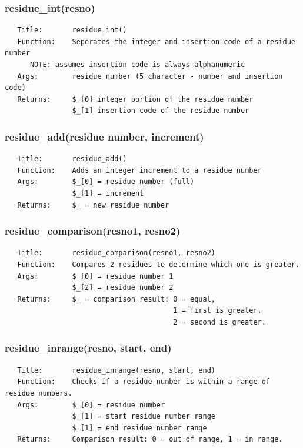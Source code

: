 \documentclass{article}
\begin{document}
\subsubsection*{residue\_int(resno)\label{pibase::residue_math_residue_int_resno_}}
\begin{verbatim}
   Title:       residue_int()
   Function:    Seperates the integer and insertion code of a residue number
      NOTE: assumes insertion code is always alphanumeric
   Args:        residue number (5 character - number and insertion code)
   Returns:     $_[0] integer portion of the residue number
                $_[1] insertion code of the residue number
\end{verbatim}
\subsubsection*{residue\_add(residue number, increment)\label{pibase::residue_math_residue_add_residue_number_increment_}}
\begin{verbatim}
   Title:       residue_add()
   Function:    Adds an integer increment to a residue number
   Args:        $_[0] = residue number (full)
                $_[1] = increment
   Returns:     $_ = new residue number
\end{verbatim}
\subsubsection*{residue\_comparison(resno1, resno2)\label{pibase::residue_math_residue_comparison_resno1_resno2_}}
\begin{verbatim}
   Title:       residue_comparison(resno1, resno2)
   Function:    Compares 2 residues to determine which one is greater.
   Args:        $_[0] = residue number 1
                $_[2] = residue number 2
   Returns:     $_ = comparison result: 0 = equal,
                                        1 = first is greater,
                                        2 = second is greater.
\end{verbatim}
\subsubsection*{residue\_inrange(resno, start, end)\label{pibase::residue_math_residue_inrange_resno_start_end_}}
\begin{verbatim}
   Title:       residue_inrange(resno, start, end)
   Function:    Checks if a residue number is within a range of residue numbers.
   Args:        $_[0] = residue number
                $_[1] = start residue number range
                $_[1] = end residue number range
   Returns:     Comparison result: 0 = out of range, 1 = in range.
\end{verbatim}
\clearpage
\end{document}
